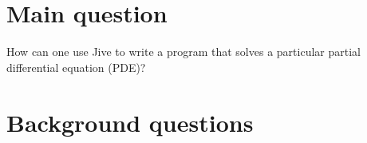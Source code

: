 \documentclass[a4paper,12pt]{article}
\begin{document}

\section{Main question}

How can one use Jive to write a program that solves a particular
partial differential equation (PDE)?



\section{Background questions}
\end{document}
